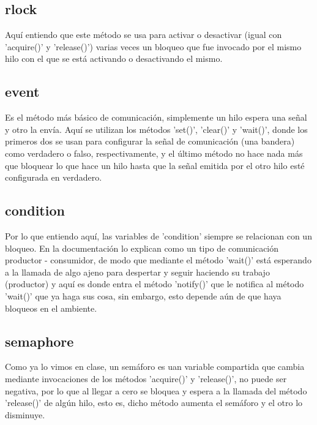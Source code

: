 \documentclass[twocolumn, letterpaper,aps,pra,10pt]{revtex4-1}
\begin{document}
\subsection{rlock}
Aquí entiendo que este método se usa para activar o desactivar (igual con 'acquire()' y 'release()') varias veces un bloqueo que fue invocado por el mismo hilo con el que se está activando o desactivando el mismo. 

\subsection{event}
Es el método más básico de comunicación, simplemente un hilo espera una señal y otro la envía. Aquí se utilizan los métodos 'set()', 'clear()' y 'wait()', donde los primeros dos se usan para configurar la señal de comunicación (una bandera) como verdadero o falso, respectivamente, y el último método no hace nada más que bloquear lo que hace un hilo hasta que la señal emitida por el otro hilo esté configurada en verdadero.

\subsection{condition}
Por lo que entiendo aquí, las variables de 'condition' siempre se relacionan con un bloqueo. En la documentación lo explican como un tipo de comunicación productor - consumidor, de modo que mediante el método 'wait()' está esperando a la llamada de algo ajeno para despertar y seguir haciendo su trabajo (productor) y aquí es donde entra el método 'notify()' que le notifica al método 'wait()' que ya haga sus cosa, sin embargo, esto depende aún de que haya bloqueos en el ambiente.

\subsection{semaphore}
Como ya lo vimos en clase, un semáforo es uan variable compartida que cambia mediante invocaciones de los métodos 'acquire()' y 'release()', no puede ser negativa, por lo que al llegar a cero se bloquea y espera a la llamada del método 'release()' de algún hilo, esto es, dicho método aumenta el semáforo y el otro lo disminuye.

\begin{thebibliography}{99}
\end{thebibliography}
\end{document}
